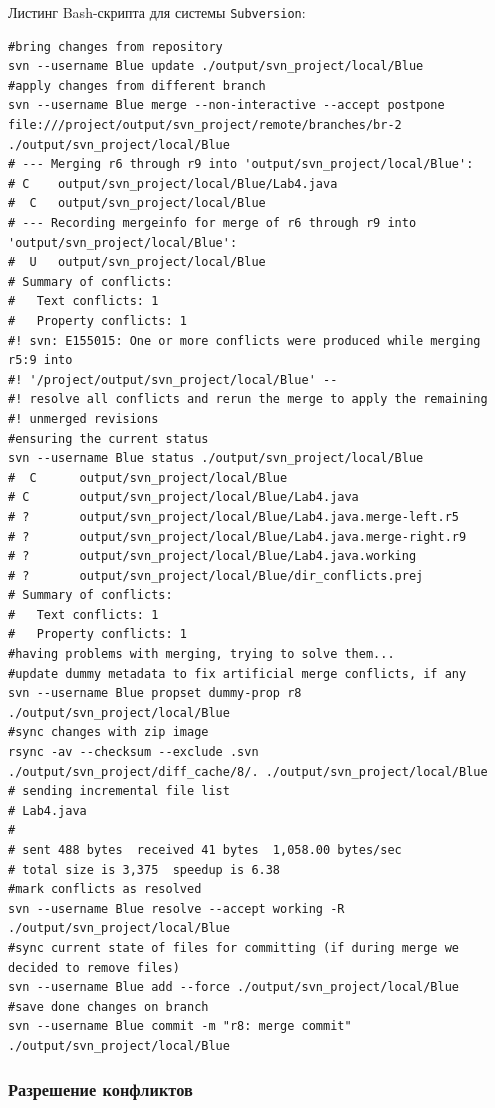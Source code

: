 Листинг Bash-скрипта для системы \texttt{Subversion}:
\begin{lstlisting}
#bring changes from repository
svn --username Blue update ./output/svn_project/local/Blue
#apply changes from different branch
svn --username Blue merge --non-interactive --accept postpone file:///project/output/svn_project/remote/branches/br-2 ./output/svn_project/local/Blue
# --- Merging r6 through r9 into 'output/svn_project/local/Blue':
# C    output/svn_project/local/Blue/Lab4.java
#  C   output/svn_project/local/Blue
# --- Recording mergeinfo for merge of r6 through r9 into 'output/svn_project/local/Blue':
#  U   output/svn_project/local/Blue
# Summary of conflicts:
#   Text conflicts: 1
#   Property conflicts: 1
#! svn: E155015: One or more conflicts were produced while merging r5:9 into
#! '/project/output/svn_project/local/Blue' --
#! resolve all conflicts and rerun the merge to apply the remaining
#! unmerged revisions
#ensuring the current status
svn --username Blue status ./output/svn_project/local/Blue
#  C      output/svn_project/local/Blue
# C       output/svn_project/local/Blue/Lab4.java
# ?       output/svn_project/local/Blue/Lab4.java.merge-left.r5
# ?       output/svn_project/local/Blue/Lab4.java.merge-right.r9
# ?       output/svn_project/local/Blue/Lab4.java.working
# ?       output/svn_project/local/Blue/dir_conflicts.prej
# Summary of conflicts:
#   Text conflicts: 1
#   Property conflicts: 1
#having problems with merging, trying to solve them...
#update dummy metadata to fix artificial merge conflicts, if any
svn --username Blue propset dummy-prop r8 ./output/svn_project/local/Blue
#sync changes with zip image
rsync -av --checksum --exclude .svn ./output/svn_project/diff_cache/8/. ./output/svn_project/local/Blue
# sending incremental file list
# Lab4.java
# 
# sent 488 bytes  received 41 bytes  1,058.00 bytes/sec
# total size is 3,375  speedup is 6.38
#mark conflicts as resolved
svn --username Blue resolve --accept working -R ./output/svn_project/local/Blue
#sync current state of files for committing (if during merge we decided to remove files)
svn --username Blue add --force ./output/svn_project/local/Blue
#save done changes on branch
svn --username Blue commit -m "r8: merge commit" ./output/svn_project/local/Blue
\end{lstlisting}


\subsubsection{Разрешение конфликтов}


